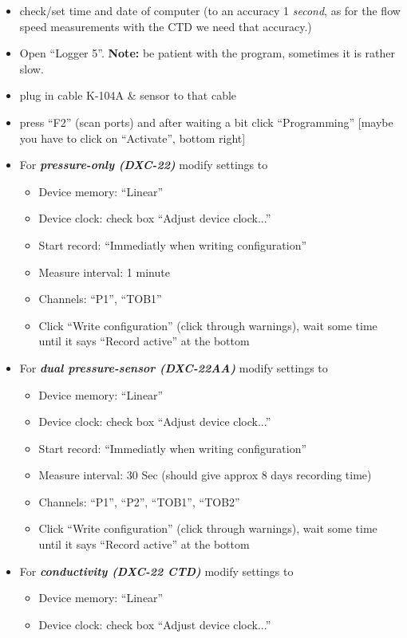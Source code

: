 \documentclass[DIV=15,halfparskip,11pt,headinclude]{scrartcl}
\begin{document}
\begin{itemize}
  \item check/set time and date of computer (to an accuracy 1
    \emph{second}, as for the flow speed measurements with the CTD we
    need that accuracy.)
  \item Open ``Logger 5''.  \textbf{Note:} be patient with the
    program, sometimes it is rather slow.
  \item plug in cable K-104A \& sensor to that cable
  \item press ``F2'' (scan ports) and after waiting a bit click
    ``Programming'' [maybe you have to click on ``Activate'', bottom right]
\item For \emph{\bf pressure-only (DXC-22)} modify settings to
  \begin{itemize}
  \item Device memory: ``Linear''
  \item Device clock: check box ``Adjust device clock...''
    \item Start record: ``Immediatly when writing configuration''
\item Measure interval: 1 minute
\item Channels: ``P1'', ``TOB1''
\item Click ``Write configuration'' (click through warnings), wait
  some time until it says ``Record active'' at the bottom
\end{itemize}
\item For \emph{\bf dual pressure-sensor (DXC-22AA)} modify settings to
  \begin{itemize}
  \item Device memory: ``Linear''
  \item Device clock: check box ``Adjust device clock...''
    \item Start record: ``Immediatly when writing configuration''
\item Measure interval: 30 Sec (should give approx 8 days recording time)
\item Channels: ``P1'', ``P2'', ``TOB1'', ``TOB2''
\item Click ``Write configuration'' (click through warnings), wait
  some time until it says ``Record active'' at the bottom
\end{itemize}
\item For \emph{\bf conductivity (DXC-22 CTD)} modify settings to
  \begin{itemize}
  \item Device memory: ``Linear''
  \item Device clock: check box ``Adjust device clock...''

\end{itemize}
\end{itemize}
\end{document}
